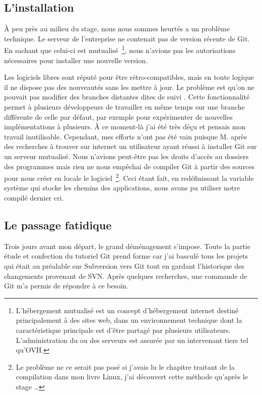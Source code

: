 \subsection{L'installation} %

À peu près au milieu du stage, nous nous sommes heurtés a un problème technique.
Le serveur de l'entreprise ne contenait pas de version récente de Git. En
sachant que celui-ci est mutualisé\, \footnote{L'hébergement mutualisé est un
concept d'hébergement internet destiné principalement à des sites web, dans un
environnement technique dont la caractéristique principale est d'être partagé
par plusieurs utilisateurs. L'administration du ou des serveurs est assurée par
un intervenant tiers tel qu'OVH.}, nous n'avions pas les autorisations
nécessaires pour installer une nouvelle version.

Les logiciels libres sont réputé pour être rétro-compatibles, mais en toute
logique il ne dispose pas des nouveautés sans les mettre à jour. Le problème
est qu'on ne pouvait pas modifier des branches distantes dites \og de suivi
\fg{}. Cette fonctionnalité permet à plusieurs développeurs de travailler en
même temps sur une branche différente de celle par défaut, par exemple pour
expérimenter de nouvelles implémentations à plusieurs. À ce moment-là j'ai été
très déçu et pensais mon travail inutilisable. Cependant, mes efforts n'ont pas
été vain puisque M. après des recherches à trouver sur internet un
utilisateur ayant réussi à installer Git sur un serveur mutualisé. Nous
n'avions peut-être pas les droits d'accès au dossiers des programmes mais rien
ne nous empêchai de compiler Git à partir des sources pour nous créer en locale
le logiciel\, \footnote{Le problème ne ce serait pas posé si j'avais lu le
chapitre traitant de la compilation dans mon livre Linux, j'ai découvert cette
méthode qu'après le stage \ldots{}}. Ceci étant fait, en redéfinissant la variable
système qui stocke les chemins des applications, nous avons pu utiliser notre
compilé dernier cri.


\subsection{Le passage fatidique} %

Trois jours avant mon départ, le grand déménagement s'impose. Toute la partie
étude et confection du tutoriel Git prend forme car j'ai basculé tous les
projets qui était au préalable sur Subversion vers Git tout en gardant
l'historique des changements provenant de SVN. Après quelques recherches, une
commande de Git m'a permis de répondre à ce besoin.

